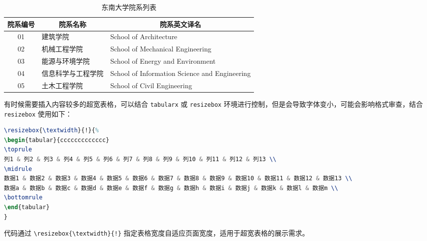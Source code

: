 \begin{table}[htbp]
\centering
\caption{东南大学院系列表}
\label{tab:4_1}
\begin{tabular}{cll}
\toprule
院系编号 & \multicolumn{1}{c}{院系名称}       & \multicolumn{1}{c}{院系英文译名 }     \\
\midrule
01                       & 建筑学院      & School of Architecture                        \\
02                       & 机械工程学院    & School of Mechanical Engineering              \\
03                       & 能源与环境学院   & School of Energy and Environment              \\
04                       & 信息科学与工程学院 & School of Information Science and Engineering \\
05                       & 土木工程学院    & School of Civil Engineering \\
\bottomrule
\end{tabular}
\end{table}

\noindent 有时候需要插入内容较多的超宽表格，可以结合 \verb|tabularx| 或 \verb|resizebox| 环境进行控制，但是会导致字体变小，可能会影响格式审查，结合 \verb|resizebox| 使用如下：

\begin{tcolorbox}
\begin{lstlisting}[language=TeX]
\resizebox{\textwidth}{!}{%
\begin{tabular}{ccccccccccccc}
\toprule
列1 & 列2 & 列3 & 列4 & 列5 & 列6 & 列7 & 列8 & 列9 & 列10 & 列11 & 列12 & 列13 \\
\midrule
数据1 & 数据2 & 数据3 & 数据4 & 数据5 & 数据6 & 数据7 & 数据8 & 数据9 & 数据10 & 数据11 & 数据12 & 数据13 \\
数据a & 数据b & 数据c & 数据d & 数据e & 数据f & 数据g & 数据h & 数据i & 数据j & 数据k & 数据l & 数据m \\
\bottomrule
\end{tabular}
}
\end{lstlisting}
\end{tcolorbox}

\noindent 代码通过 \verb|\resizebox{\textwidth}{!}| 指定表格宽度自适应页面宽度，适用于超宽表格的展示需求。

\begin{table}[htbp]
\centering
\caption{超宽测试表格示例（结合 \textbackslash resizebox\{\textwidth\}\{!\} 使用）}
\label{tab:4_wide1}
\end{table}



